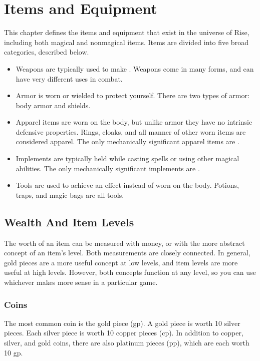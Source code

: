 \chapter{Items and Equipment}

This chapter defines the items and equipment that exist in the universe of Rise, including both magical and nonmagical items.
Items are divided into five broad categories, described below.
\begin{itemize}
    \item Weapons are typically used to make .
        Weapons come in many forms, and can have very different uses in combat.
    \item Armor is worn or wielded to protect yourself.
        There are two types of armor: body armor and shields.
    \item Apparel items are worn on the body, but unlike armor they have no intrinsic defensive properties.
        Rings, cloaks, and all manner of other worn items are considered apparel.
        The only mechanically significant apparel items are .
    \item Implements are typically held while casting spells or using other magical abilities.
        The only mechanically significant implements are .
    \item Tools are used to achieve an effect instead of worn on the body.
        Potions, traps, and magic bags are all tools.
\end{itemize}

\section{Wealth And Item Levels}\label{Wealth}

    The worth of an item can be measured with money, or with the more abstract concept of an item's level.
    Both measurements are closely connected.
    In general, gold pieces are a more useful concept at low levels, and item levels are more useful at high levels.
    However, both concepts function at any level, so you can use whichever makes more sense in a particular game.

    \subsection{Coins}
        The most common coin is the gold piece (gp). A gold piece is worth 10 silver pieces. Each silver piece is worth 10 copper pieces (cp). In addition to copper, silver, and gold coins, there are also platinum pieces (pp), which are each worth 10 gp.

